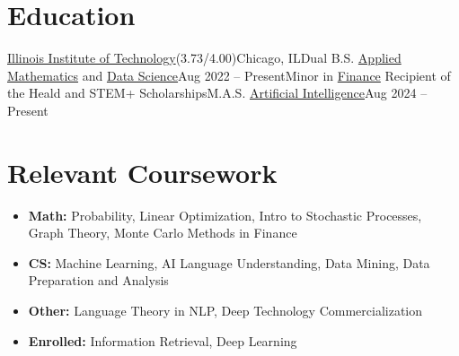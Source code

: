 \documentclass[letterpaper,10pt]{article}
\makeatletter
\newcommand{\resumeSubheading}[4]{
    \item\vspace{-2pt}
    \begin{tabular*}{0.97\textwidth}[t]{l@{\extracolsep{\fill}}r}
      \textbf{#1} & #2 \\
      #3 & #4 \\
    \end{tabular*}%
}
\newcommand{\resumeSubHeadingListStart}{\begin{itemize}[leftmargin=0.15in, label=]}
\newcommand{\resumeSubHeadingListEnd}{\end{itemize}}
\makeatother
\begin{document}
\section{Education}
  \resumeSubHeadingListStart
    \resumeEducationHeading
      {\href{https://www.iit.edu/}{Illinois Institute of Technology}}{(3.73/4.00)}{Chicago, IL}{Dual B.S. \href{https://catalog.iit.edu/undergraduate/colleges/computing/applied-mathematics/bs/\#text}{Applied Mathematics} and \href{https://catalog.iit.edu/undergraduate/colleges/computing/computer-science/\#:~:text=The\%20B.S.\%20in\%20Data,be\%20successful\%20data\%20science\%20professionals.}{Data Science}}{Aug 2022 -- Present}{Minor in
      \href{https://catalog.iit.edu/undergraduate/colleges/business/minor-finance/\#:~:text=business\%20schools\%20worldwide.-,Required\%20Courses,-Course\%20List}{Finance}}
      {Recipient of the Heald and STEM+ Scholarships}{M.A.S. \href{https://catalog.iit.edu/graduate/colleges/computing/computer-science/master-artificial-intelligence/\#overviewtext}{Artificial Intelligence}}{Aug 2024 -- Present}
  \resumeSubHeadingListEnd

\vspace{-12pt}
\section{Relevant Coursework}
\resumeSubHeadingListStart
    \item \textbf{Math:} Probability, Linear Optimization, Intro to Stochastic Processes, Graph Theory, Monte Carlo Methods in Finance \vspace{-5pt}
    \item \textbf{CS:} Machine Learning, AI Language Understanding, Data Mining, Data Preparation and Analysis \vspace{-5pt}
    \item \textbf{Other:} Language Theory in NLP, Deep Technology Commercialization \vspace{-5pt}
    \item \textbf{Enrolled:} Information Retrieval, Deep Learning
\resumeSubHeadingListEnd
\end{document}
